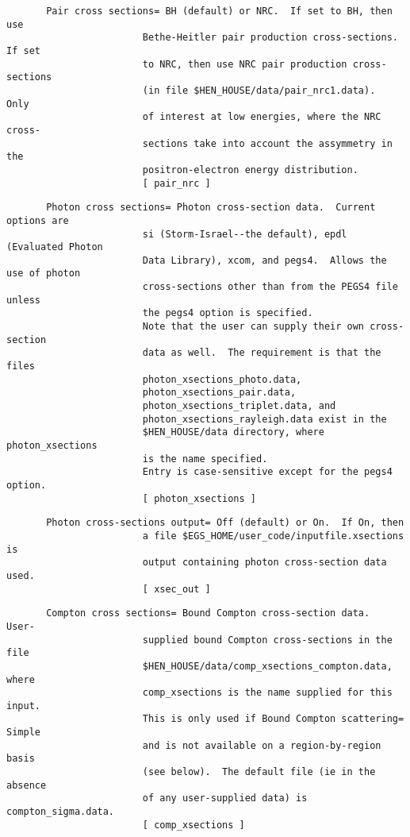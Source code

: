 \begin{verbatim}
       Pair cross sections= BH (default) or NRC.  If set to BH, then use
                        Bethe-Heitler pair production cross-sections.  If set
                        to NRC, then use NRC pair production cross-sections
                        (in file $HEN_HOUSE/data/pair_nrc1.data).  Only
                        of interest at low energies, where the NRC cross-
                        sections take into account the assymmetry in the
                        positron-electron energy distribution.
                        [ pair_nrc ]
\end{verbatim}
\begin{verbatim}
       Photon cross sections= Photon cross-section data.  Current options are
                        si (Storm-Israel--the default), epdl (Evaluated Photon
                        Data Library), xcom, and pegs4.  Allows the use of photon
                        cross-sections other than from the PEGS4 file unless
                        the pegs4 option is specified.
                        Note that the user can supply their own cross-section
                        data as well.  The requirement is that the files
                        photon_xsections_photo.data,
                        photon_xsections_pair.data,
                        photon_xsections_triplet.data, and
                        photon_xsections_rayleigh.data exist in the
                        $HEN_HOUSE/data directory, where photon_xsections
                        is the name specified.
                        Entry is case-sensitive except for the pegs4 option.
                        [ photon_xsections ]
\end{verbatim}
\begin{verbatim}
       Photon cross-sections output= Off (default) or On.  If On, then
                        a file $EGS_HOME/user_code/inputfile.xsections is
                        output containing photon cross-section data used.
                        [ xsec_out ]
\end{verbatim}
\begin{verbatim}
       Compton cross sections= Bound Compton cross-section data.  User-
                        supplied bound Compton cross-sections in the file
                        $HEN_HOUSE/data/comp_xsections_compton.data, where
                        comp_xsections is the name supplied for this input.
                        This is only used if Bound Compton scattering= Simple
                        and is not available on a region-by-region basis
                        (see below).  The default file (ie in the absence
                        of any user-supplied data) is compton_sigma.data.
                        [ comp_xsections ]
\end{verbatim}
